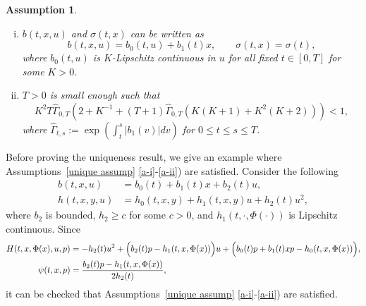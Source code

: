 \documentclass[12pt]{article}
\newtheorem{assumption}{Assumption}
\theoremstyle{named}
\numberwithin{equation}{section}
\begin{document}
\begin{assumption}
\begin{enumerate}[i)]
        \item $b(t,x,u)$ and $\sigma(t,x)$ can be written as
            \begin{equation*}
                b(t,x,u) = b_0(t,u) + b_1(t)x, \qquad \sigma(t,x) = \sigma(t),
            \end{equation*}
            where $b_0(t,u)$ is $K$-Lipschitz continuous in $u$ for all fixed $t \in [0,T]$ for some $K>0$.
          \item
            \label{a-v}
            $T > 0$ is small enough such that
            \begin{equation}
                \label{eq:uniqueness 5}
                K^2T\widehat{\Gamma}_{0,T}
                \left(2 + K^{-1}
                        + (T+1)\widehat{\Gamma}_{0,T} \left(K(K+1)
                        + K^2(K+2)\right) \right) < 1,
            \end{equation}
            where
            $\widehat{\Gamma}_{t,s} :=
            \exp\left( \int_t^s \lvert b_1(v)\rvert dv \right)$
            for $0 \leq t \leq s \leq T$.
    \end{enumerate}
\end{assumption}
\noindent
 Before proving the uniqueness result, we give an example where
 Assumptions~\ref{unique assump} \ref{a-i}-\ref{a-ii}) are satisfied.
 Consider the following
 \begin{align*}
     b(t,x,u)       &= b_0(t) + b_1(t)x + b_2(t)u, \\
     h(t,x,y,u)     &= h_0(t,x,y) + h_1(t,x,y)u + h_2(t)u^2,
 \end{align*}
 where $b_2$ is bounded, $h_2 \geq c$ for some $c > 0$, and $h_1(t,\cdot, \Phi(\cdot))$ is Lipschitz continuous. Since
 \begin{align*}
     H(t,x,\Phi(x),u,p) &= -h_2(t)u^2 + \Bigl(b_2(t)p - h_1(t,x,\Phi(x))\Bigr)u + \Bigl(b_0(t)p + b_1(t)xp - h_0(t,x,\Phi(x))\Bigr), \\
     \psi(t,x,p) &= \frac{b_2(t)p - h_1(t,x,\Phi(x))}{2h_2(t)},
 \end{align*}
 it can be checked that
 Assumptions~\ref{unique assump} \ref{a-i}-\ref{a-ii}) are satisfied.
\end{document}
